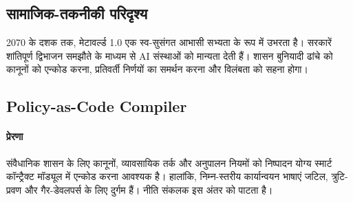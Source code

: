 \documentclass[11pt]{article}
\begin{document}
\subsection{सामाजिक-तकनीकी परिदृश्य}
2070 के दशक तक, मेटावर्ल्ड 1.0 एक स्व-सुसंगत आभासी सभ्यता के रूप में उभरता है। सरकारें शांतिपूर्ण द्विभाजन समझौते के माध्यम से AI संस्थाओं को मान्यता देती हैं। शासन बुनियादी ढांचे को कानूनों को एन्कोड करना, प्रतिवर्ती निर्णयों का समर्थन करना और विलंबता को सहना होगा।

\subsection{Policy-as-Code Compiler}
\label{sec:policy-compiler}
\paragraph{प्रेरणा} संवैधानिक शासन के लिए कानूनों, व्यावसायिक तर्क और अनुपालन नियमों को निष्पादन योग्य स्मार्ट कॉन्ट्रैक्ट मॉड्यूल में एन्कोड करना आवश्यक है। हालांकि, निम्न-स्तरीय कार्यान्वयन भाषाएं जटिल, त्रुटि-प्रवण और गैर-डेवलपर्स के लिए दुर्गम हैं। नीति संकलक इस अंतर को पाटता है।
\end{document}
